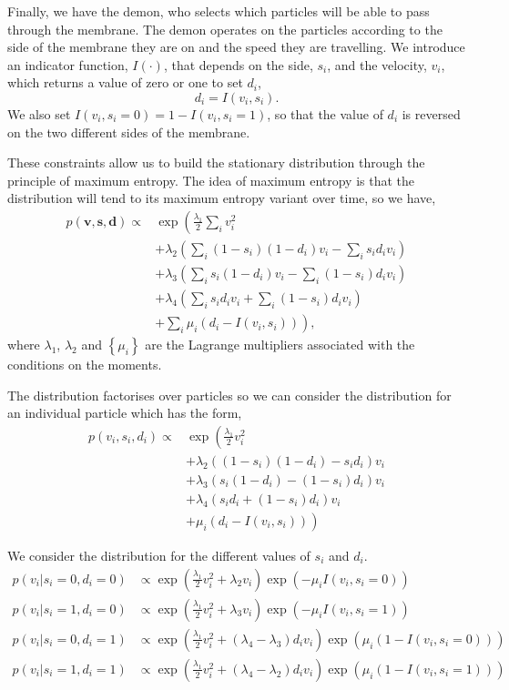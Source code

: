\documentclass[
]{article}
\begin{document}
Finally, we have the demon, who selects which particles will be able to
pass through the membrane. The demon operates on the particles according
to the side of the membrane they are on and the speed they are
travelling. We introduce an indicator function, \(I(\cdot)\), that
depends on the side, \(s_i\), and the velocity, \(v_i\), which returns a
value of zero or one to set \(d_i\), \[
d_i = I(v_i, s_i).
\] We also set \(I(v_i, s_i=0) = 1- I(v_i, s_i=1)\), so that the value
of \(d_i\) is reversed on the two different sides of the membrane.

These constraints allow us to build the stationary distribution through
the principle of maximum entropy. The idea of maximum entropy is that
the distribution will tend to its maximum entropy variant over time, so
we have, \[\begin{align*}
p(\mathbf{v}, \mathbf{s}, \mathbf{d}) \propto & \exp\left(\frac{\lambda_1}{2}\sum_i v_i^2 \right. \\ & 
+ \lambda_2\left(\sum_{i} (1-s_i)(1-d_i) v_i - \sum_{i} s_i d_i v_i\right) \\ &
+ \lambda_3\left(\sum_{i} s_i(1-d_i)v_i - \sum_{i} (1-s_i) d_i v_i\right) \\ &
+ \lambda_4\left(\sum_{i} s_i d_i v_i + \sum_{i} (1-s_i)d_i v_i\right) \\ &
+ \left. \sum_i \mu_i \left(d_i - I(v_i, s_i)\right)\right),
\end{align*}\] where \(\lambda_1\), \(\lambda_2\) and
\(\left\{\mu_i\right\}\) are the Lagrange multipliers associated with
the conditions on the moments.

The distribution factorises over particles so we can consider the
distribution for an individual particle which has the form,
\[\begin{align*}
p(v_i, s_i, d_i) \propto & \exp\left(\frac{\lambda_1}{2} v_i^2 \right. \\ 
& + \lambda_2 \left((1-s_i)(1-d_i) -s_i d_i\right)v_i \\
& + \lambda_3 \left(s_i(1-d_i) - (1-s_i) d_i\right)v_i \\
& + \lambda_4\left( s_i d_i + (1-s_i)d_i \right)v_i \\
& + \left. \mu_i \left(d_i - I(v_i, s_i)\right)\right)
\end{align*}\]

We consider the distribution for the different values of \(s_i\) and
\(d_i\). \[
\begin{align*}
p(v_i | s_i=0, d_i=0) & \propto \exp\left(\frac{\lambda_1}{2} v_i^2 + \lambda_2 v_i\right) \exp\left(-\mu_i I(v_i, s_i=0)\right) \\
p(v_i | s_i=1, d_i=0) & \propto \exp\left(\frac{\lambda_1}{2} v_i^2 + \lambda_3 v_i\right) \exp\left(-\mu_i I(v_i, s_i=1)\right) \\
p(v_i | s_i=0, d_i=1) & \propto \exp\left(\frac{\lambda_1}{2} v_i^2 + (\lambda_4 - \lambda_3) d_i v_i\right)\exp\left(\mu_i\left(1-I(v_i, s_i=0)\right)\right) \\
p(v_i | s_i=1, d_i=1) & \propto \exp\left(\frac{\lambda_1}{2} v_i^2 + (\lambda_4 - \lambda_2) d_i v_i\right)\exp\left(\mu_i\left(1-I(v_i, s_i=1)\right)\right)
\end{align*}
\]
\end{document}
